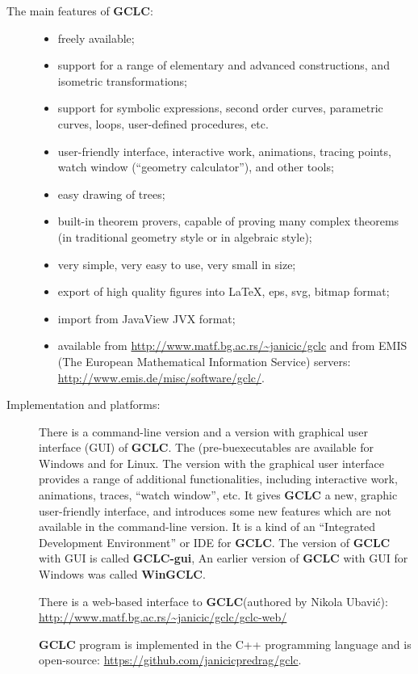 \documentclass[a4paper]{book}
\newcommand{\gclc}{{\bfseries GCLC}\xspace}
\newcommand{\wingclc}{{\bfseries WinGCLC}\xspace}
\newcommand{\gclcgui}{{\bfseries GCLC-gui}\xspace}
\begin{document}
\begin{description}
\item[The main features of \gclc:] \hfill
\begin{itemize}
\item freely available;
\item support for a range of elementary and advanced constructions,
and isometric transformations;
\item support for symbolic expressions, second order curves,
parametric curves, loops, user-defined procedures, etc.
\item user-friendly interface, interactive work, animations,
tracing points, watch window (``geometry calculator''), and other
tools;
\item easy drawing of trees;
\item built-in theorem provers, capable of proving many complex
theorems (in traditional geometry style or in algebraic style);
\item very simple, very easy to use, very small in size;
\item export of high quality figures into \LaTeX{}, {\sc eps},
{\sc svg}, bitmap format;
\item import from JavaView JVX format;
\item available from \url{http://www.matf.bg.ac.rs/~janicic/gclc}
and from EMIS (The European Mathematical Information Service) servers:
\url{http://www.emis.de/misc/software/gclc/}.
\end{itemize}

\item[Implementation and platforms:]
There is a command-line version and a version with graphical user
interface (GUI) of \gclc. The (pre-buexecutables are available for Windows and for Linux.
The version with the graphical user interface provides a
range of additional functionalities, including interactive work,
animations, traces, ``watch window'', etc. It gives \gclc a new,
graphic user-friendly interface, and introduces some new features
which are not available in the command-line version. It is a kind
of an ``Integrated Development Environment'' or IDE for \gclc.
The version of \gclc with GUI is called \gclcgui,
An earlier version of \gclc with GUI for Windows was called \wingclc.
\index{wingclc@\wingclc}
\index{gclc-gui@\gclcgui}

There is a web-based interface to \gclc (authored by Nikola Ubavić):
\url{http://www.matf.bg.ac.rs/~janicic/gclc/gclc-web/}

\gclc program is implemented in the C++ programming language
and is open-source: \url{https://github.com/janicicpredrag/gclc}.


\end{description}
\end{document}
